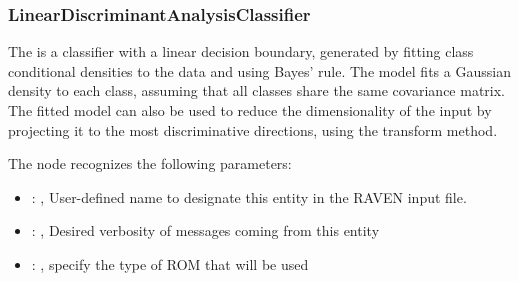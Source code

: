 

\subsubsection{LinearDiscriminantAnalysisClassifier}
  The  is a classifier with a linear decision
  boundary,     generated by fitting class conditional densities to the data and using Bayes' rule.
  The model fits a Gaussian density to each class, assuming that all classes share the same
  covariance matrix.     The fitted model can also be used to reduce the dimensionality of the input
  by projecting it to the most discriminative     directions, using the transform method.

  The  node recognizes the following parameters:
    \begin{itemize}
      \item {}: , 
        User-defined name to designate this entity in the RAVEN input file.
      \item {}: , 
        Desired verbosity of messages coming from this entity
      \item {}: , 
        specify the type of ROM that will be used
  \end{itemize}

